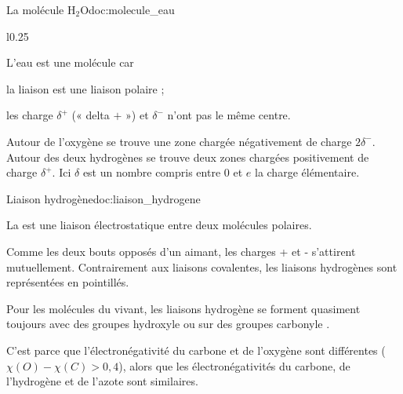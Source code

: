 \begin{doc}{La molécule H$_2$O}{doc:molecule_eau} 
  \begin{wrapfigure}[3]{l}{0.25\linewidth}
    \centering
    \vspace*{-20pt}
  \end{wrapfigure}
  \phantom{b}\vspace*{-20pt}
    
  \begin{importants}
    L'eau est une molécule  car 
    \begin{listePoints}
      \item la liaison  est une liaison polaire ;
      \item les charge $\delta^+$ (« delta $+$ ») et $\delta^-$ n'ont pas le même centre.
    \end{listePoints}
  \end{importants}

  Autour de l'oxygène se trouve une zone chargée négativement de charge $2\delta^-$.
  Autour des deux hydrogènes se trouve deux zones chargées positivement de charge $\delta^+$.  
  Ici $\delta$ est un nombre compris entre $0$ et $e$ la charge élémentaire.
\end{doc}

\begin{doc}{Liaison hydrogène}{doc:liaison_hydrogene}
  \begin{importants}
    La  est une liaison électrostatique entre deux molécules polaires.
  \end{importants}
  Comme les deux bouts opposés d'un aimant, les charges + et - s'attirent mutuellement.
  Contrairement aux liaisons covalentes, les liaisons hydrogènes sont représentées en pointillés.

  \begin{importants}  
    Pour les molécules du vivant, les liaisons hydrogène se forment quasiment toujours avec des groupes hydroxyle  ou sur des groupes carbonyle .
  \end{importants}
  C'est parce que l'électronégativité du carbone et de l'oxygène sont différentes ($\chi(O) - \chi(C) > 0,4$),
  alors que les électronégativités du carbone, de l'hydrogène et de l'azote sont similaires.
\end{doc}

